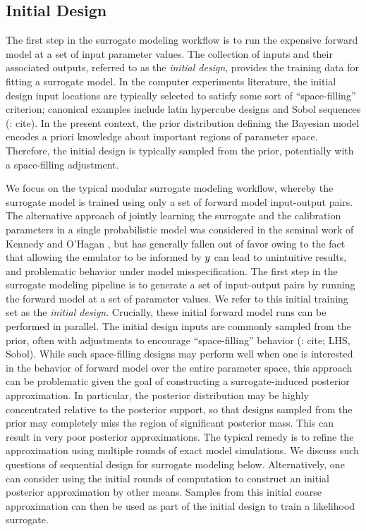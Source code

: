 \documentclass[12pt]{article}
\begin{document}
\subsection{Initial Design}
The first step in the surrogate modeling workflow is to run the expensive forward model at a set of input parameter 
values. The collection of inputs and their associated outputs, referred to as the \textit{initial design},
provides the training data for fitting a surrogate model. In the computer experiments literature, the initial design input
locations are typically selected to satisfy some sort of ``space-filling'' criterion; canonical examples include 
latin hypercube designs and Sobol sequences (\todo: cite). In the present context, the prior distribution defining the 
Bayesian model encodes a priori knowledge about important regions of parameter space. Therefore, the initial 
design is typically sampled from the prior, potentially with a space-filling adjustment. 

We focus on the typical modular \citep{modularization} surrogate modeling workflow, whereby the surrogate model is trained 
using only a set of forward model input-output pairs. The alternative approach of jointly learning the surrogate and the 
calibration parameters in a single probabilistic model was considered in the seminal work of Kennedy and O'Hagan \citep{KOH},
but has generally fallen out of favor owing to the fact that allowing the emulator to be informed by $y$ can lead to unintuitive 
results, and problematic behavior under model misspecification. The first step in the surrogate modeling pipeline is to generate
a set of input-output pairs by running the forward model at a set of parameter values. We refer to this initial training set as the 
\textit{initial design}. Crucially, these initial forward model runs can be performed in parallel.
The initial design inputs are commonly sampled from the prior, often with adjustments to encourage ``space-filling'' 
behavior (\todo: cite; LHS, Sobol). While such space-filling designs may perform well when one is interested in the behavior of 
forward model over the entire parameter space, this approach can be problematic given the goal of constructing a surrogate-induced
posterior approximation. In particular, the posterior distribution may be highly concentrated relative to the posterior
support, so that designs sampled from the prior may completely miss the region of significant posterior mass. This can result 
in very poor posterior approximations. The typical remedy is to refine the approximation using multiple rounds of exact model 
simulations. We discuss such questions of sequential design for surrogate modeling below. Alternatively, one can consider using 
the initial rounds of computation to construct an initial posterior approximation by other means. Samples from this initial coarse 
approximation can then be used as part of the initial design to train a likelihood surrogate. 
\end{document}
